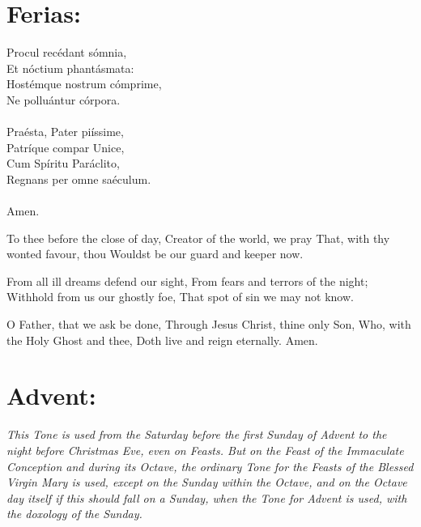 \documentclass[a5paper,12pt,twoside,openany]{memoir}
\newlength{\gcolwidth}
\newcommand\rubrics[1]{\textit{#1}}
\begin{document}

\section{Ferias:}


\begin{minipage}[t]{\gcolwidth}
Procul recédant sómnia,\\
Et nóctium phantásmata:\\
Hostémque nostrum cómprime,\\
Ne polluántur córpora.\\
 ~ \\
Praésta, Pater piíssime,\\
Patríque compar Unice,\\
Cum Spíritu Paráclito,\\
Regnans per omne saéculum.\\
 ~ \\
Amen.
\end{minipage}
\begin{minipage}[t]{\gcolwidth}
\inglesh To thee before the close of day,
Creator of the world, we pray
That, with thy wonted favour, thou
Wouldst be our guard and keeper now.

From all ill dreams defend our sight,
From fears and terrors of the night;
Withhold from us our ghostly foe,
That spot of sin we may not know.

O Father, that we ask be done,
Through Jesus Christ, thine only Son,
Who, with the Holy Ghost and thee,
Doth live and reign eternally. Amen.
\end{minipage}

\section{Advent:}

\rubrics{This Tone is used from the Saturday before the first Sunday of Advent to the night before Christmas Eve, even on Feasts. But on the Feast of the Immaculate Conception and during its Octave, the ordinary Tone for the Feasts of the Blessed Virgin Mary is used, except on the Sunday within the Octave, and on the Octave day itself if this should fall on a Sunday, when the Tone for Advent is used, with the doxology of the Sunday.}

\end{document}
